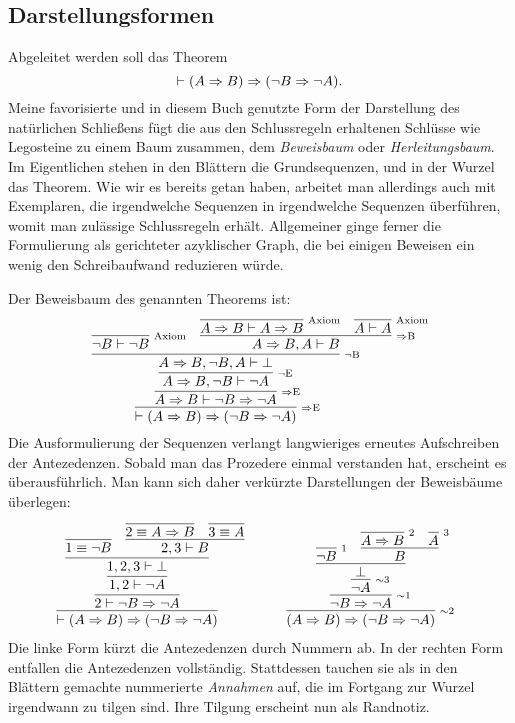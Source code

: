 \subsection{Darstellungsformen}

Abgeleitet werden soll das Theorem
\[\vdash (A\Rightarrow B)\Rightarrow (\lnot B\Rightarrow\lnot A).\]
Meine favorisierte und in diesem Buch genutzte Form der Darstellung
des natürlichen Schließens fügt die aus den Schlussregeln erhaltenen
Schlüsse wie Legosteine zu einem Baum zusammen, dem
\emph{Beweisbaum} oder \emph{Herleitungsbaum}.
Im Eigentlichen stehen in den Blättern die Grundsequenzen, und in der
Wurzel das Theorem. Wie wir es bereits getan haben, arbeitet man
allerdings auch mit Exemplaren, die irgendwelche Sequenzen in
irgendwelche Sequenzen überführen, womit man zulässige Schlussregeln
erhält. Allgemeiner ginge ferner die Formulierung als gerichteter
azyklischer Graph, die bei einigen Beweisen ein wenig den
Schreibaufwand reduzieren würde.

Der Beweisbaum des genannten Theorems ist:
\[
\infer[\infernote{$\cond$E}]{\vdash (A\cond B)\cond (\lnot B\cond\lnot A)}{
  \infer[\infernote{$\cond$E}]{A\cond B\vdash \lnot B\cond\lnot A}{
    \infer[\infernote{$\lnot$E}]{A\cond B, \lnot B\vdash\lnot A}{
      \infer[\infernote{$\lnot$B}]{A\cond B, \lnot B, A\vdash\bot}{
        \infer[\infernote{Axiom}]{\lnot B\vdash\lnot B}{}
      & \infer[\infernote{$\cond$B}]{A\cond B, A\vdash B}{
          \infer[\infernote{Axiom}]{A\cond B\vdash A\cond B}{}
        & \infer[\infernote{Axiom}]{A\vdash A}{}}}}}}
\]
Die Ausformulierung der Sequenzen verlangt langwieriges erneutes
Aufschreiben der Antezedenzen. Sobald man das Prozedere einmal
verstanden hat, erscheint es überausführlich. Man kann sich daher
verkürzte Darstellungen der Beweisbäume überlegen:
\[
\begin{tabular}{@{}l@{\qquad\quad}l}
\infer{\vdash (A\cond B)\cond (\lnot B\cond\lnot A)}{
  \infer{2\vdash \lnot B\cond\lnot A}{
    \infer{1, 2\vdash\lnot A}{
      \infer{1, 2, 3\vdash\bot}{
        \infer{1\equiv\lnot B}{}
      & \infer{2, 3\vdash B}{
          \infer{2\equiv A\cond B}{}
        & \infer{3\equiv A}{}}}}}}
&
\infer[\infernote{$\sim$2}]{(A\cond B)\cond (\lnot B\cond\lnot A)}{
  \infer[\infernote{$\sim$1}]{\lnot B\cond\lnot A}{
    \infer[\infernote{$\sim$3}]{\lnot A}{
      \infer{\bot}{
        \infer[\infernote{1}]{\lnot B}{}
      & \infer{B}{
          \infer[\infernote{2}]{A\cond B}{}
        & \infer[\infernote{3}]{A}{}}}}}}
\end{tabular}
\]
Die linke Form kürzt die Antezedenzen durch Nummern ab. In der rechten
Form entfallen die Antezedenzen vollständig. Stattdessen tauchen sie
als in den Blättern gemachte nummerierte \emph{Annahmen} auf, die im
Fortgang zur Wurzel irgendwann zu tilgen sind. Ihre Tilgung erscheint
nun als Randnotiz.

